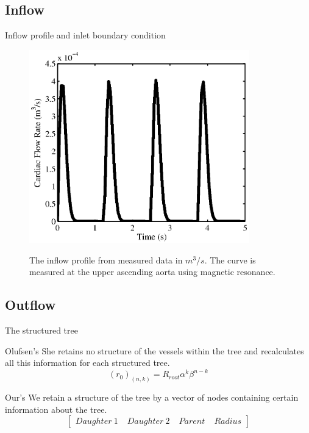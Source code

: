 \documentclass{beamer}
\begin{document}
\subsection{Inflow}
\begin{frame}{Inflow profile and inlet boundary condition}

\begin{figure}[ht]
	\includegraphics[width=3.75in]{inflow}
	\label{inflower}
	\caption{The inflow profile from measured data in $m^3/s$. The curve is measured at the upper ascending aorta using magnetic resonance.}
\end{figure}

\end{frame}

\subsection{Outflow}
\begin{frame}{The structured tree}
	\begin{block}{Olufsen's}
		She retains no structure of the vessels within the tree and recalculates all this information for each structured tree.	
		\begin{equation}
			\label{radius}
			(r_0)_(n,k) = R_{root} \alpha^k\beta^{n-k}
		\end{equation}
	\end{block}
	
	\begin{block}{Our's}
		We retain a structure of the tree by a vector of nodes containing certain information about the tree. 
		\begin{equation}
			\begin{bmatrix}
			Daughter \: 1 \; & Daughter \: 2 \; & Parent \; & Radius 
			\end{bmatrix}
		\end{equation}
	\end{block}
		
\end{frame}
\end{document}
